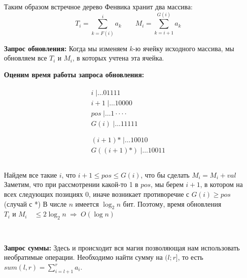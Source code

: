 Таким образом встречное дерево Фенвика хранит два массива:
$$T_i=\sum_{k=F(i)}^{i}a_k \qquad M_i =\sum_{k=i+1}^{G(i)}a_k$$
\par \textbf{Запрос обновления:} Когда мы изменяем 
$k$-ю ячейку исходного массива, мы обновляем все $T_i$ и $M_i$, в которых учтена эта ячейка.
\\ \par \textbf{Оценим время работы запроса обновления:}
\newline \begin{minipage}{0.3\textwidth}
  \begin{flushleft}
	$$
    \begin{array}{r}
    \begin{array}{r}
    i \;| \ldots01111\\
    i+1 \;| \ldots10000\\
    pos \;| \ldots1 \cdot \cdot \cdot\cdot \\
    G(i) \;| \ldots11111\\
    \end{array} \\
    \hline
    \begin{array}{r}
    (i+1)\text{*} \;| \ldots10010\\
    G((i+1)\text{*}) \;| \ldots10011\\
    \end{array} \\
    \end{array}
    $$
  \end{flushleft}
\end{minipage}
\begin{minipage}{0.7\textwidth}
\vspace{2ex}
  \begin{flushright}
    Найдем все такие $i$, что $i+1 \leq pos \leq G(i)$, что бы сделать $M_i=M_i + val$
	\newline Заметим, что при рассмотрении какой-то 1 в $pos$, мы берем $i+1$, в котором на всех следующих позициях 0, иначе возникает противоречие с $G(i) \geq pos$ (случай с *)
	\newline В числе $n$ имеется $\log_{2}{n}$ бит. Поэтому, время обновления  $T_i \text{ и } M_i \quad \leq 2\log_{2}{n} \; \Rightarrow \; O(\log n)$
  \end{flushright}
\end{minipage}
\\ \par \textbf{Запрос суммы:} Здесь и происходит вся магия позволяющая нам использовать необратимые операции. Необходимо найти сумму на $(l;r]$, то есть $sum(l,r)=\sum_{i=l+1}^{r}a_i$.
